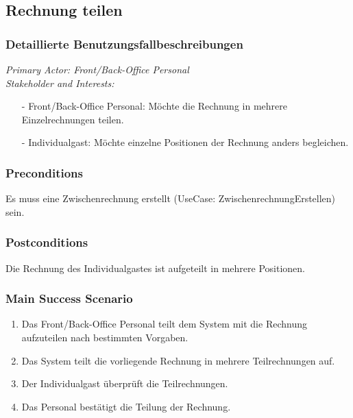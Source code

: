 \documentclass[./detailed_overview_usecases.tex]{subfiles}
\begin{document}
    \subsection{Rechnung teilen}
    \subsubsection{Detaillierte Benutzungsfallbeschreibungen}
    \textit{Primary Actor: Front/Back-Office Personal}
    \\
    \textit{Stakeholder and Interests:}
    \begin{itemize}
        \item[-] Front/Back-Office Personal: Möchte die Rechnung in mehrere Einzelrechnungen teilen.
        \item[-] Individualgast: Möchte einzelne Positionen der Rechnung anders begleichen.
    \end{itemize}

    \subsubsection*{Preconditions}
    Es muss eine Zwischenrechnung erstellt (UseCase: ZwischenrechnungErstellen) sein.

    \subsubsection*{Postconditions}
    Die Rechnung des Individualgastes ist aufgeteilt in mehrere Positionen.

    \subsubsection*{Main Success Scenario}
    \begin{enumerate}
        \item Das Front/Back-Office Personal teilt dem System mit die Rechnung aufzuteilen nach bestimmten Vorgaben.
        \item Das System teilt die vorliegende Rechnung in mehrere Teilrechnungen auf.
        \item Der Individualgast überprüft die Teilrechnungen.
        \item Das Personal bestätigt die Teilung der Rechnung.
    \end{enumerate}
\end{document}
